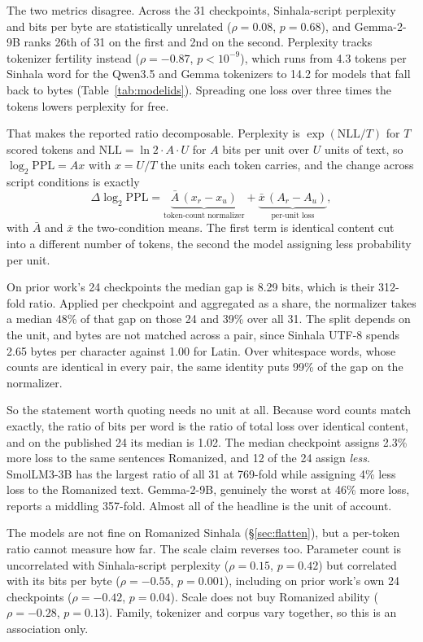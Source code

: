 \documentclass{article}
\begin{document}
The two metrics disagree. Across the 31 checkpoints, Sinhala-script perplexity and bits
per byte are statistically unrelated ($\rho = 0.08$, $p = 0.68$), and Gemma-2-9B
ranks 26th of 31 on the first and 2nd on the second. Perplexity tracks tokenizer
fertility instead ($\rho = -0.87$, $p < 10^{-9}$), which runs from 4.3 tokens per
Sinhala word for the Qwen3.5 and Gemma tokenizers to 14.2 for models that fall back to
bytes (Table~\ref{tab:modelids}). Spreading one loss over three times the tokens lowers
perplexity for free.

That makes the reported ratio decomposable. Perplexity is
$\exp(\mathrm{NLL}/T)$ for $T$ scored tokens and $\mathrm{NLL} = \ln 2 \cdot A \cdot
U$ for $A$ bits per unit over $U$ units of text, so $\log_2 \mathrm{PPL} = A x$ with
$x = U/T$ the units each token carries, and the change across script conditions is
exactly
\begin{equation}
\Delta \log_2 \mathrm{PPL} =
\underbrace{\bar{A}\,(x_r - x_u)}_{\text{token-count normalizer}}
+ \underbrace{\bar{x}\,(A_r - A_u)}_{\text{per-unit loss}},
\label{eq:decomp}
\end{equation}
with $\bar{A}$ and $\bar{x}$ the two-condition means. The first term is identical content
cut into a different number of tokens, the second the model assigning less probability
per unit.

On prior work's 24 checkpoints \citep{rajapakse-weerasinghe-2026-script} the median gap
is 8.29 bits, which is their 312-fold ratio. Applied per checkpoint and aggregated as a
share, the normalizer takes a median 48\% of that gap on those 24 and 39\% over all 31.
The split depends on the unit, and bytes are not matched across a pair, since Sinhala
UTF-8 spends 2.65 bytes per character against 1.00 for Latin. Over whitespace words, whose
counts are identical in every pair, the same identity puts 99\% of the gap on the
normalizer.

So the statement worth quoting needs no unit at all. Because word counts match exactly,
the ratio of bits per word is the ratio of total loss over identical content, and on the
published 24 its median is 1.02. The median checkpoint assigns 2.3\%
more loss to the same sentences Romanized, and 12 of the 24 assign \emph{less}. SmolLM3-3B has the
largest ratio of all 31 at 769-fold while assigning 4\% less loss to the Romanized text.
Gemma-2-9B, genuinely the worst at 46\% more loss, reports a middling 357-fold. Almost
all of the headline is the unit of account.

The models are not fine on Romanized Sinhala (\S\ref{sec:flatten}), but a per-token ratio
cannot measure how far. The scale claim reverses too. Parameter count is uncorrelated with Sinhala-script perplexity
($\rho = 0.15$, $p = 0.42$) but correlated with its bits per byte
($\rho = -0.55$, $p = 0.001$), including on prior work's own 24 checkpoints
($\rho = -0.42$, $p = 0.04$). Scale does not buy Romanized ability
($\rho = -0.28$, $p = 0.13$). Family, tokenizer and corpus vary together, so
this is an association only.
\end{document}
